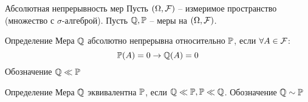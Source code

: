 \documentclass[aspectratio=169]{beamer}
\begin{document}


\begin{frame}{Абсолютная непрерывность мер}
    Пусть $(\Omega, \mathcal{F})$ -- измеримое пространство (множество с $\sigma$-алгеброй). Пусть $\mathbb{Q}, \mathbb{P}$ -- меры на $(\Omega, \mathcal{F})$.

    \begin{block}{Определение}
        Мера $\mathbb{Q}$ абсолютно непрерывна относительно $\mathbb{P}$, если $\forall A \in \mathcal{F}$:
        $$
            \mathbb{P}(A) = 0 \to \mathbb{Q}(A) = 0
        $$Обозначение $\mathbb{Q} \ll \mathbb{P}$
    \end{block}

    \begin{block}{Определение}
        Мера $\mathbb{Q}$ эквивалентна $\mathbb{P}$, если $\mathbb{Q} \ll \mathbb{P}, \mathbb{P} \ll \mathbb{Q}$. Обозначение $\mathbb{Q} \sim \mathbb{P}$
    \end{block}
\end{frame}
\end{document}
